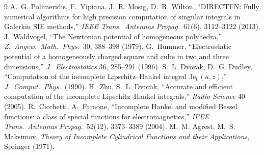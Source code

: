 \documentclass[11pt]{article}
\theoremstyle{remark}
\begin{document}
\begin{thebibliography}{9}
 A.~G. Polimeridis, F.~Vipiana, J.~R. Mosig, D.~R. Wilton,
``DIRECTFN: Fully numerical algorithms for high precision computation of singular
integrals in Galerkin SIE methods,'' \emph{IEEE Trans.\ Antennas Propag.}\ 61(6),
3112--3122 (2013).
 J.~Waldvogel, ``The Newtonian potential of homogeneous
polyhedra,'' \emph{Z.\ Angew.\ Math.\ Phys.}\ 30, 388--398 (1979).
 G.~Hummer, ``Electrostatic potential of a homogeneously charged
square and cube in two and three dimensions,'' \emph{J.\ Electrostatics} 36,
285--291 (1996).
 S.~L. Dvorak, D.~G. Dudley, ``Computation of the incomplete
Lipschitz--Hankel integral $\mathrm{Je}_0(a,z)$,'' \emph{J.\ Comput.\ Phys.}\ (1990).
 H.~Zhu, S.~L. Dvorak, ``Accurate and efficient computation of the
incomplete Lipschitz--Hankel integrals,'' \emph{Radio Science} 40 (2005).
 R.~Cicchetti, A.~Faraone, ``Incomplete Hankel and modified Bessel
functions: a class of special functions for electromagnetics,'' \emph{IEEE Trans.\
Antennas Propag.}\ 52(12), 3373--3389 (2004).
 M.~M. Agrest, M.~S. Maksimov, \emph{Theory of Incomplete
Cylindrical Functions and their Applications}, Springer (1971).
\end{thebibliography}
\end{document}
